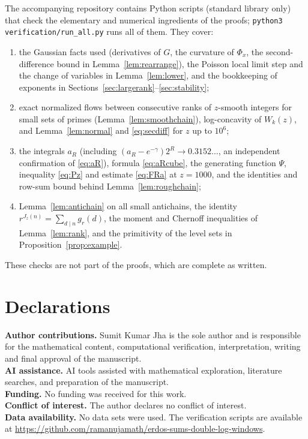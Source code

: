 \documentclass[11pt,a4paper]{article}
\numberwithin{equation}{section}
\theoremstyle{plain}
\theoremstyle{definition}
\theoremstyle{remark}
\begin{document}
The accompanying repository contains Python scripts (standard library only) that check the elementary and numerical ingredients of the proofs; \texttt{python3 verification/run\_all.py} runs all of them. They cover:
\begin{enumerate}[label=(\Alph*)]
\item the Gaussian facts used (derivatives of $G$, the curvature of $\Phi_x$, the second-difference bound in Lemma~\ref{lem:rearrange}), the Poisson local limit step and the change of variables in Lemma~\ref{lem:lower}, and the bookkeeping of exponents in Sections~\ref{sec:largerank}--\ref{sec:stability};
\item exact normalized flows between consecutive ranks of $z$-smooth integers for small sets of primes (Lemma~\ref{lem:smoothchain}), log-concavity of $W_k(z)$, and Lemma~\ref{lem:normal} and \eqref{eq:secdiff} for $z$ up to $10^6$;
\item the integrals $a_R$ (including $(a_R-e^{-\gamma})2^R\to0.3152\ldots$, an independent confirmation of \eqref{eq:aR}), formula \eqref{eq:aRcube}, the generating function $\Psi$, inequality \eqref{eq:Pz} and estimate \eqref{eq:FRa} at $z=1000$, and the identities and row-sum bound behind Lemma~\ref{lem:roughchain};
\item Lemma~\ref{lem:antichain} on all small antichains, the identity $r^{J_z(n)}=\sum_{d\mid n}g_r(d)$, the moment and Chernoff inequalities of Lemma~\ref{lem:rank}, and the primitivity of the level sets in Proposition~\ref{prop:example}.
\end{enumerate}
These checks are not part of the proofs, which are complete as written.

\section*{Declarations}
\textbf{Author contributions.} Sumit Kumar Jha is the sole author and is responsible for the mathematical content, computational verification, interpretation, writing and final approval of the manuscript.\\
\textbf{AI assistance.} AI tools assisted with mathematical exploration, literature searches, and preparation of the manuscript.\\
\textbf{Funding.} No funding was received for this work.\\
\textbf{Conflict of interest.} The author declares no conflict of interest.\\
\textbf{Data availability.} No data sets were used. The verification scripts are available at \url{https://github.com/ramanujamath/erdos-sums-double-log-windows}.
\end{document}
